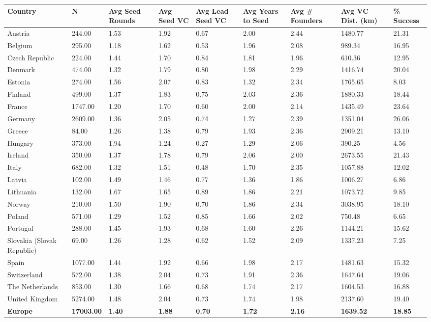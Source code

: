 \begin{table}[ht]
\centering
\begin{tabular}{lllllllll}
  \toprule
Country & N & Avg Seed Rounds & Avg Seed VC & Avg Lead Seed VC & Avg Years to Seed & Avg \# Founders & Avg VC Dist. (km) & \% Success \\ 
  \midrule
Austria & 244.00 & 1.53 & 1.92 & 0.67 & 2.00 & 2.44 & 1480.77 & 21.31 \\ 
  Belgium & 295.00 & 1.18 & 1.62 & 0.53 & 1.96 & 2.08 & 989.34 & 16.95 \\ 
  Czech Republic & 224.00 & 1.44 & 1.70 & 0.84 & 1.81 & 1.96 & 610.36 & 12.95 \\ 
  Denmark & 474.00 & 1.32 & 1.79 & 0.80 & 1.98 & 2.29 & 1416.74 & 20.04 \\ 
  Estonia & 274.00 & 1.56 & 2.07 & 0.83 & 1.32 & 2.34 & 1765.65 & 8.03 \\ 
  Finland & 499.00 & 1.37 & 1.83 & 0.75 & 2.03 & 2.36 & 1880.33 & 18.44 \\ 
  France & 1747.00 & 1.20 & 1.70 & 0.60 & 2.00 & 2.14 & 1435.49 & 23.64 \\ 
  Germany & 2609.00 & 1.36 & 2.05 & 0.74 & 1.27 & 2.39 & 1351.04 & 26.06 \\ 
  Greece & 84.00 & 1.26 & 1.38 & 0.79 & 1.93 & 2.36 & 2909.21 & 13.10 \\ 
  Hungary & 373.00 & 1.94 & 1.24 & 0.27 & 1.29 & 2.06 & 390.25 & 4.56 \\ 
  Ireland & 350.00 & 1.37 & 1.78 & 0.79 & 2.06 & 2.00 & 2673.55 & 21.43 \\ 
  Italy & 682.00 & 1.32 & 1.51 & 0.48 & 1.70 & 2.35 & 1057.88 & 12.02 \\ 
  Latvia & 102.00 & 1.49 & 1.46 & 0.77 & 1.36 & 1.86 & 1006.27 & 6.86 \\ 
  Lithuania & 132.00 & 1.67 & 1.65 & 0.89 & 1.86 & 2.21 & 1073.72 & 9.85 \\ 
  Norway & 210.00 & 1.50 & 1.90 & 0.70 & 1.86 & 2.34 & 3038.95 & 18.10 \\ 
  Poland & 571.00 & 1.29 & 1.52 & 0.85 & 1.66 & 2.02 & 750.48 & 6.65 \\ 
  Portugal & 288.00 & 1.45 & 1.93 & 0.68 & 1.60 & 2.26 & 1144.21 & 15.62 \\ 
  Slovakia (Slovak Republic) & 69.00 & 1.26 & 1.28 & 0.62 & 1.52 & 2.09 & 1337.23 & 7.25 \\ 
  Spain & 1077.00 & 1.44 & 1.92 & 0.66 & 1.98 & 2.17 & 1481.63 & 15.32 \\ 
  Switzerland & 572.00 & 1.38 & 2.04 & 0.73 & 1.91 & 2.36 & 1647.64 & 19.06 \\ 
  The Netherlands & 853.00 & 1.30 & 1.66 & 0.68 & 1.74 & 2.17 & 1604.53 & 16.88 \\ 
  United Kingdom & 5274.00 & 1.48 & 2.04 & 0.73 & 1.74 & 1.98 & 2137.60 & 19.40 \\ 
  \textbf{Europe} & \textbf{17003.00} & \textbf{1.40} & \textbf{1.88} & \textbf{0.70} & \textbf{1.72} & \textbf{2.16} & \textbf{1639.52} & \textbf{18.85} \\ 
   \bottomrule
\end{tabular}
\label{tab:seed_summary_clean}
\end{table}
